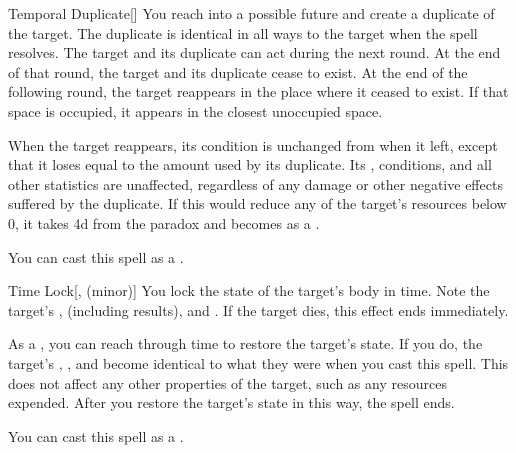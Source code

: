 \lowercase{\hypertarget{spell:Temporal Duplicate}{}}\label{spell:Temporal Duplicate}
\begin{freeability}[\nth{4}]{\hypertarget{spell:Temporal Duplicate}{Temporal Duplicate}}[]
You reach into a possible future and create a duplicate of the target.
The duplicate is identical in all ways to the target when the spell resolves.
The target and its duplicate can act during the next round.
At the end of that round, the target and its duplicate cease to exist.
At the end of the following round, the target reappears in the place where it ceased to exist.
If that space is occupied, it appears in the closest unoccupied space.

When the target reappears, its condition is unchanged from when it left, except that it loses  equal to the amount used by its duplicate.
Its , conditions, and all other statistics are unaffected, regardless of any damage or other negative effects suffered by the duplicate.
If this would reduce any of the target's resources below 0, it takes  \plus4d from the paradox and becomes  as a .

You can cast this spell as a .
\end{freeability}
\vspace{0.25em}



\lowercase{\hypertarget{spell:Time Lock}{}}\label{spell:Time Lock}
\begin{freeability}[\nth{4}]{\hypertarget{spell:Time Lock}{Time Lock}}[,  (minor)]
You lock the state of the target's body in time.
Note the target's ,  (including  results), and .
If the target dies, this effect ends immediately.

As a , you can reach through time to restore the target's state.
If you do, the target's , , and  become identical to what they were when you cast this spell.
This does not affect any other properties of the target, such as any resources expended.
After you restore the target's state in this way, the spell ends.

You can cast this spell as a .
\end{freeability}
\vspace{0.25em}



